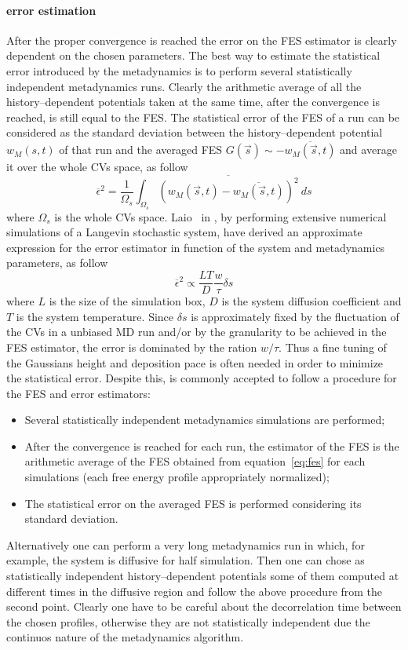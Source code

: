 \paragraph{\textbf{error estimation}} After the proper convergence is reached the error on the \ac{FES} estimator is clearly dependent on the chosen parameters. The best way to estimate the statistical error introduced by the metadynamics is to perform several statistically independent metadynamics runs. Clearly the arithmetic average of all the history--dependent potentials taken at the same time, after the convergence is reached, is still equal to the \ac{FES}. The statistical error of the \ac{FES} of a run can be considered as the standard deviation between the history--dependent potential $w_M(s,t)$ of that run and the averaged \ac{FES} $G(\vec s) \sim - \overline{w_M(\vec s,t)}$ and average it over the whole \acp{CV} space, as follow
\begin{equation*}
\overline{\epsilon}^2 = \frac{1}{\Omega_s} \int_{\Omega_s}  \overline{(w_M(\vec s,t) - \overline{w_M(\vec s,t)})^2}\ ds
\end{equation*}
where $\Omega_s$ is the whole \acp{CV} space. Laio \etal\, in \cite{MetadError}, by performing extensive numerical simulations of a Langevin stochastic system, have derived an approximate expression for the error estimator in function of the system and metadynamics parameters, as follow
\begin{equation*}
	\overline{\epsilon}^2 \propto \frac{LT}{D}\frac{w}{\tau} \delta s 
\end{equation*}
where $L$ is the size of the simulation box, $D$ is the system diffusion coefficient and $T$ is the system temperature. Since $\delta s$ is approximately fixed by the fluctuation of the \acp{CV} in a unbiased \ac{MD} run and/or by the granularity to be achieved in the \ac{FES} estimator, the error is dominated by the ration $w/\tau$. Thus a fine tuning of the Gaussians height and deposition pace is often needed in order to minimize the statistical error. Despite this, is commonly accepted to follow a procedure for the \ac{FES} and error estimators:
\begin{itemize}
	\item Several statistically independent metadynamics simulations are performed;
	\item After the convergence is reached for each run, the estimator of the \ac{FES} is the arithmetic average of the \ac{FES} obtained from equation~\eqref{eq:fes} for each simulations (each free energy profile appropriately normalized);
	\item The statistical error on the averaged \ac{FES} is performed considering its standard deviation. 
\end{itemize}
Alternatively one can perform a very long metadynamics run in which, for example, the system is diffusive for half simulation. Then one can chose as statistically independent history--dependent potentials some of them computed at different times in the diffusive region and follow the above procedure from the second point. Clearly one have to be careful about the decorrelation time between the chosen profiles, otherwise they are not statistically independent due the continuos nature of the metadynamics algorithm.


